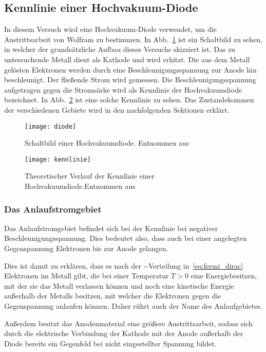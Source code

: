 \subsection{Kennlinie einer Hochvakuum-Diode}
%
In diesem Versuch wird eine Hochvakuum-Diode verwendet, um die
Austrittsarbeit von Wolfram zu bestimmen. In Abb.~\ref{fig:diode} ist
ein Schaltbild zu sehen, in welcher der grundsätzliche Aufbau dieses Versuchs skizziert ist.
Das zu untersuchende Metall dient als Kathode und wird
erhitzt. Die aus dem Metall gelösten Elektronen werden durch eine
Beschleunigungsspannung zur Anode hin beschleunigt. Der fließende Strom
wird gemessen. Die Beschleunigungsspannung aufgetragen gegen die
Stromsärke wird als Kennlinie der Hochvakuumdiode bezeichnet.
In Abb.~\ref{fig:theorie_kennlinie} ist eine solche Kennlinie zu sehen.
Das Zustandekommen der verschiedenen Gebiete wird in den nachfolgenden
Sektionen erklärt.
%
\begin{figure}[]
\centering
\texttt{[image: diode]}
\caption{Schaltbild einer Hochvakuumdiode. Entnommen aus \textcite{v504}}
\label{fig:diode}
\end{figure}
%
\begin{figure}[]
\centering
\texttt{[image: kennlinie]}
\caption{Theoretischer Verlauf der Kennlinie einer Hochvakuumdiode.Entnommen aus \textcite{v504}}
\label{fig:theorie_kennlinie}
\end{figure}
%
\subsubsection{Das Anlaufstromgebiet}
%
Das Anlaufstromgebiet befindet sich bei der Kennlinie bei negativer
Beschleunigungsspannung. Dies bedeutet also, dass auch bei einer
angelegten Gegenspannung Elektronen bis zur Anode gelangen.

Dies ist damit zu erklären, dass es nach der
--Verteilung in~\eqref{eq:fermi_dirac}
Elektronen im Metall gibt, die bei einer Temperatur $T > 0$ eine Energiebesitzen, mit der sie das Metall verlassen können und noch eine
kinetische Energie außerhalb der Metalls besitzen, mit welcher die
Elektronen gegen die Gegenspannung anlaufen können. Daher rührt auch der Name des Anlaufgebietes.

Außerdem besitzt das Anodenmaterial eine größere Austrittsarbeit, sodass sich durch die elektrische Verbindung der Kathode mit der Anode
außerhalb der Diode bereits ein Gegenfeld bei nicht eingestellter
Spannung bildet.

